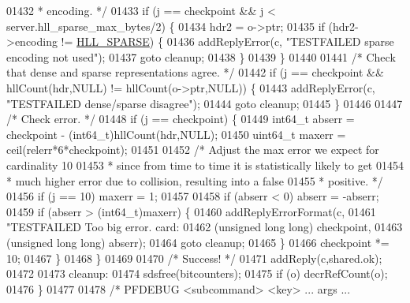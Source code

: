 \begin{DoxyCode}
{{{01432 \textcolor{comment}{         * encoding. */}
01433         \textcolor{keywordflow}{if} (j == checkpoint && j < server.hll\_sparse\_max\_bytes/2) \{
01434             hdr2 = o->ptr;
01435             \textcolor{keywordflow}{if} (hdr2->encoding != \hyperlink{hyperloglog_8c_afe326d57dd3d7c27c8fe52dc2c19cecd}{HLL\_SPARSE}) \{
01436                 addReplyError(c, \textcolor{stringliteral}{"TESTFAILED sparse encoding not used"});
01437                 \textcolor{keywordflow}{goto} cleanup;
01438             \}
01439         \}
01440 
01441         \textcolor{comment}{/* Check that dense and sparse representations agree. */}
01442         \textcolor{keywordflow}{if} (j == checkpoint && hllCount(hdr,NULL) != hllCount(o->ptr,NULL)) \{
01443                 addReplyError(c, \textcolor{stringliteral}{"TESTFAILED dense/sparse disagree"});
01444                 \textcolor{keywordflow}{goto} cleanup;
01445         \}
01446 
01447         \textcolor{comment}{/* Check error. */}
01448         \textcolor{keywordflow}{if} (j == checkpoint) \{
01449             int64\_t abserr = checkpoint - (int64\_t)hllCount(hdr,NULL);
01450             uint64\_t maxerr = ceil(relerr*6*checkpoint);
01451 
01452             \textcolor{comment}{/* Adjust the max error we expect for cardinality 10}
01453 \textcolor{comment}{             * since from time to time it is statistically likely to get}
01454 \textcolor{comment}{             * much higher error due to collision, resulting into a false}
01455 \textcolor{comment}{             * positive. */}
01456             \textcolor{keywordflow}{if} (j == 10) maxerr = 1;
01457 
01458             \textcolor{keywordflow}{if} (abserr < 0) abserr = -abserr;
01459             \textcolor{keywordflow}{if} (abserr > (int64\_t)maxerr) \{
01460                 addReplyErrorFormat(c,
01461                     \textcolor{stringliteral}{"TESTFAILED Too big error. card:%
01462                     (\textcolor{keywordtype}{unsigned} \textcolor{keywordtype}{long} \textcolor{keywordtype}{long}) checkpoint,
01463                     (\textcolor{keywordtype}{unsigned} \textcolor{keywordtype}{long} \textcolor{keywordtype}{long}) abserr);
01464                 \textcolor{keywordflow}{goto} cleanup;
01465             \}
01466             checkpoint *= 10;
01467         \}
01468     \}
01469 
01470     \textcolor{comment}{/* Success! */}
01471     addReply(c,shared.ok);
01472 
01473 cleanup:
01474     sdsfree(bitcounters);
01475     \textcolor{keywordflow}{if} (o) decrRefCount(o);
01476 \}
01477 
01478 \textcolor{comment}{/* PFDEBUG <subcommand> <key> ... args ...}
}}}}
\end{DoxyCode}
